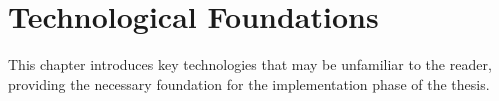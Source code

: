 \chapter{Technological Foundations}
\label{chap:TechnologicalFoundations}
This chapter introduces key technologies that may be unfamiliar to the reader, providing the necessary foundation for the implementation phase of the thesis.


